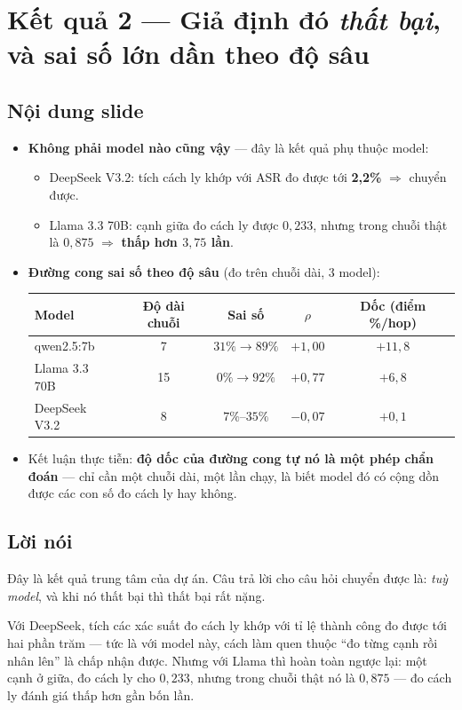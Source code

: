 \documentclass[11pt,a4paper]{article}
\newcommand{\slide}[1]{\section{#1}}
\newcommand{\noidung}{\subsection*{Nội dung slide}}
\newcommand{\loinoi}{\subsection*{Lời nói}}
\begin{document}
\slide{Kết quả 2 --- Giả định đó \emph{thất bại}, và sai số lớn dần theo độ sâu}

\noidung
\begin{itemize}
  \item \textbf{Không phải model nào cũng vậy} --- đây là kết quả phụ thuộc model:
        \begin{itemize}
          \item DeepSeek V3.2: tích cách ly khớp với ASR đo được tới \textbf{2{,}2\%}
                $\Rightarrow$ chuyển được.
          \item Llama 3.3 70B: cạnh giữa đo cách ly được $0{,}233$, nhưng trong chuỗi
                thật là $0{,}875$ $\Rightarrow$ \textbf{thấp hơn $3{,}75$ lần}.
        \end{itemize}
  \item \textbf{Đường cong sai số theo độ sâu} (đo trên chuỗi dài, 3 model):
        \begin{center}
        \begin{tabular}{|l|c|c|c|c|}
        \hline
        \textbf{Model} & \textbf{Độ dài chuỗi} & \textbf{Sai số} & \textbf{$\rho$} &
        \textbf{Dốc (điểm \%/hop)}\\
        \hline
        qwen2.5:7b & 7 & $31\% \to 89\%$ & $+1{,}00$ & $+11{,}8$\\
        Llama 3.3 70B & 15 & $0\% \to 92\%$ & $+0{,}77$ & $+6{,}8$\\
        DeepSeek V3.2 & 8 & $7\%$--$35\%$ & $-0{,}07$ & $+0{,}1$\\
        \hline
        \end{tabular}
        \end{center}
  \item Kết luận thực tiễn: \textbf{độ dốc của đường cong tự nó là một phép chẩn
        đoán} --- chỉ cần một chuỗi dài, một lần chạy, là biết model đó có cộng dồn
        được các con số đo cách ly hay không.
\end{itemize}

\loinoi
Đây là kết quả trung tâm của dự án. Câu trả lời cho câu hỏi chuyển được là: \emph{tuỳ
model}, và khi nó thất bại thì thất bại rất nặng.

Với DeepSeek, tích các xác suất đo cách ly khớp với tỉ lệ thành công đo được tới hai
phần trăm --- tức là với model này, cách làm quen thuộc ``đo từng cạnh rồi nhân lên''
là chấp nhận được. Nhưng với Llama thì hoàn toàn ngược lại: một cạnh ở giữa, đo cách
ly cho $0{,}233$, nhưng trong chuỗi thật nó là $0{,}875$ --- đo cách ly đánh giá thấp
hơn gần bốn lần.
\end{document}
